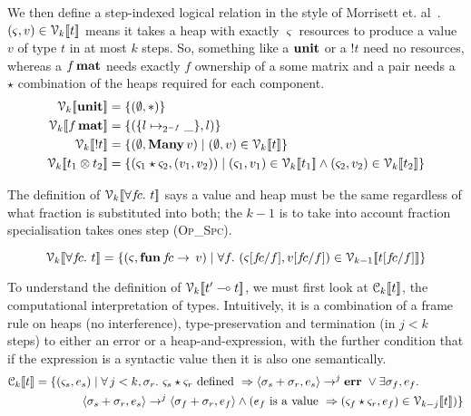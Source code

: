 We then define a step-indexed logical relation in the style of Morrisett et.
al~\cite{morrisett}. $(\varsigma, v) \in \mathcal{V}_{k} [\![ t ]\!]$ means it takes a heap with
exactly $\varsigma$ resources to produce a value $v$ of type $t$ in at most $k$
steps. So, something like a $\mathbf{unit}$ or a $!t$ need no resources, whereas
a $f\, \mathbf{mat}$ needs exactly $f$ ownership of a some matrix and a pair
needs a $\star$ combination of the heaps required for each component.
\begin{align*}
  \V{k}{ \Unit } &= \{ (\empH, \ast) \} \\
  \V{k}{ f \, \Mat } &= \{ (\{ l \mapsto_{2^{-f}} \_ \} , l) \} \\
  \V{k}{ \Bang t } &= \{ (\empH, \Many\, v) \mid (\empH, v) \in \V{k}{t} \} \\
  \V{k}{ t_1 \otimes t_2 } &= \{ (\varsigma_1 \star \varsigma_2, ( v_1, v_2 )) \mid (\varsigma_1, v_1) \in \V{k}{t_1} \wedge (\varsigma_2, v_2) \in \V{k}{t_2} \}
\end{align*}

The definition of $\V{k}{\forall f\!c.\ t}$ says a value and heap
must be the same regardless of what fraction is substituted into both; the
$k-1$ is to take into account fraction specialisation takes ones step
(\textsc{Op\_Spc}).

\vspace{-\baselineskip}
\[
    \V{k}{ \forall f\!c.\  t } = \{ (\varsigma, \ottkw{fun}\, f\!c \rightarrow \, v) \mid \forall f.\ (\varsigma [ f\!c / f ], v [ f\!c / f ]) \in \V{k-1}{ t [ f\!c / f ] } \}
\]

To understand the definition of $\mathcal{V}_{k} [\![ t' \multimap t ]\!]$, we must first look at
$\mathcal{C}_{k} [\![ t ]\!]$, the computational interpretation of types. Intuitively, it is a
combination of a frame rule on heaps (no interference), type-preservation and
termination (in $j < k$ steps) to either an error or a heap-and-expression,
with the further condition that if the expression is a syntactic value then it
is also one semantically.
\begin{align*}
    \mathcal{C}_{k} [\![  t  ]\!] &= \{ (\varsigma_s, e_s) \mid \forall \, j < k, \sigma_r.\ \varsigma_s \star \varsigma_r \textrm{ defined } \Rightarrow \langle \sigma_s + \sigma_r, e_s \rangle \rightarrow^j \mathbf{err}\ \vee \exists \sigma_f, e_f.\\
               & \qquad \qquad \langle \sigma_s + \sigma_r, e_s \rangle \rightarrow^j \langle \sigma_f + \sigma_r, e_f \rangle \wedge ( e_f \textrm { is a value } \Rightarrow ( \varsigma_f \star \varsigma_r, e_f ) \in \mathcal{V}_{k-j} [\![ t ]\!] ) \}
\end{align*}

